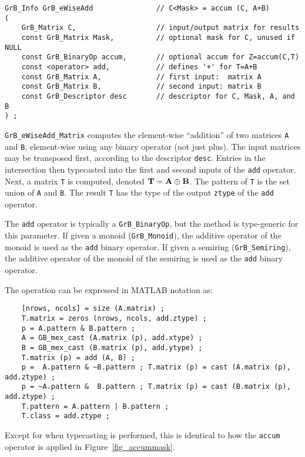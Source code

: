 \documentclass[12pt]{article}
\begin{document}
\begin{mdframed}[userdefinedwidth=6in]
{\footnotesize
\begin{verbatim}
GrB_Info GrB_eWiseAdd               // C<Mask> = accum (C, A+B)
(
    GrB_Matrix C,                   // input/output matrix for results
    const GrB_Matrix Mask,          // optional mask for C, unused if NULL
    const GrB_BinaryOp accum,       // optional accum for Z=accum(C,T)
    const <operator> add,           // defines '+' for T=A+B
    const GrB_Matrix A,             // first input:  matrix A
    const GrB_Matrix B,             // second input: matrix B
    const GrB_Descriptor desc       // descriptor for C, Mask, A, and B
) ;
\end{verbatim} } \end{mdframed}

\verb'GrB_eWiseAdd_Matrix' computes the element-wise ``addition'' of two
matrices \verb'A' and \verb'B', element-wise using any binary operator (not
just plus).  The input matrices may be transposed first, according to the
descriptor \verb'desc'.  Entries in the intersection then typecasted into the
first and second inputs of the \verb'add' operator.  Next, a matrix \verb'T' is
computed, denoted ${\bf T = A \oplus B}$.  The pattern of \verb'T' is the set
union of \verb'A' and \verb'B'.  The result \verb'T' has the type of the output
\verb'ztype' of the \verb'add' operator.

The \verb'add' operator is typically a \verb'GrB_BinaryOp', but the method is
type-generic for this parameter.  If given a monoid (\verb'GrB_Monoid'), the
additive operator of the monoid is used as the \verb'add' binary operator.  If
given a semiring (\verb'GrB_Semiring'), the additive operator of the monoid of
the semiring is used as the \verb'add' binary operator.

\vspace{0.05in}
The operation can be expressed in MATLAB notation as:
    {\footnotesize
    \begin{verbatim}
    [nrows, ncols] = size (A.matrix) ;
    T.matrix = zeros (nrows, ncols, add.ztype) ;
    p = A.pattern & B.pattern ;
    A = GB_mex_cast (A.matrix (p), add.xtype) ;
    B = GB_mex_cast (B.matrix (p), add.ytype) ;
    T.matrix (p) = add (A, B) ;
    p =  A.pattern & ~B.pattern ; T.matrix (p) = cast (A.matrix (p), add.ztype) ;
    p = ~A.pattern &  B.pattern ; T.matrix (p) = cast (B.matrix (p), add.ztype) ;
    T.pattern = A.pattern | B.pattern ;
    T.class = add.ztype ; \end{verbatim} }
Except for when typecasting is performed, this is identical to how the
\verb'accum' operator is applied in Figure~\ref{fig_accummask}.
\end{document}
